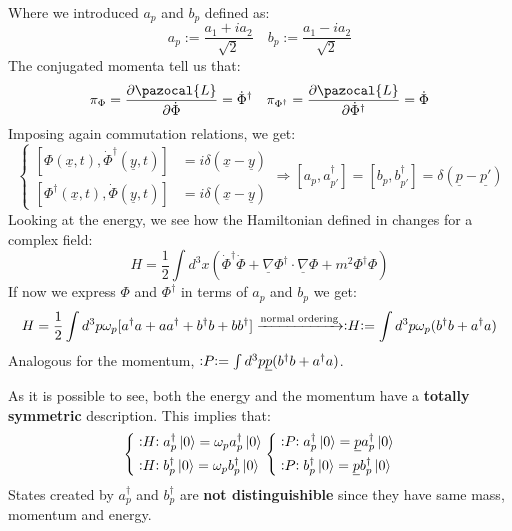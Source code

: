\documentclass[../main.tex]{subfiles}
\begin{document}
Where we introduced $a_p$ and $b_p$ defined as:
\[
a_p:=\frac{a_1+ia_2}{\sqrt{2}} \quad
b_p:=\frac{a_1-ia_2}{\sqrt{2}}
\]
The conjugated momenta tell us that:
\[
\pi_\Phi=\frac{\partial\pazocal{L}}{\partial\Dot{\Phi}}=\Dot{\Phi}^\dagger \quad 
\pi_{\Phi^\dagger}=\frac{\partial\pazocal{L}}{\partial\Dot{\Phi}^\dagger}=\Dot{\Phi}
\]
Imposing again commutation relations, we get:
\[
\left\{
\begin{aligned}
[\Phi(\underline{x},t),\Dot{\Phi}^\dagger(\underline{y},t)]&=i\delta(\underline{x}-\underline{y})\\
[\Phi^\dagger(\underline{x},t),\Dot{\Phi}(\underline{y},t)]&=i\delta(\underline{x}-\underline{y})
\end{aligned}
\right.
\Rightarrow
[a_p,a^\dagger_{p'}]=[b_p,b^\dagger_{p'}]=\delta(\underline{p}-\underline{p'})
\]
Looking at the energy, we see how the Hamiltonian defined in  changes for a complex field:
\[
H=\frac{1}{2}\int d^3x\left(\Dot{\Phi}^\dagger\Dot{\Phi}+\underline{\nabla}\Phi^\dagger\cdot\underline{\nabla}\Phi+m^2\Phi^\dagger\Phi\right)
\]
If now we express $\Phi$ and $\Phi^\dagger$ in terms of $a_p$ and $b_p$ we get:
\[
H=\frac{1}{2}\int d^3p\omega_p[a^\dagger a+aa^\dagger+b^\dagger b+bb^\dagger]\xrightarrow[]{\text{normal ordering}}\vcentcolon\mathrel{H}\vcentcolon=\int d^3p\omega_p(b^\dagger b+a^\dagger a)
\]
Analogous for the momentum, $\vcentcolon\mathrel{P}\vcentcolon=\int d^3p\underline{p}(b^\dagger b+a^\dagger a)$. 

As it is possible to see, both the energy and the momentum have a \textbf{totally symmetric} description. This implies that:
\[
\left\{
\begin{aligned}
&\vcentcolon\mathrel{H}\vcentcolon a^\dagger_p\ket{0}=\omega_pa^\dagger_p\ket{0}\\ &\vcentcolon\mathrel{H}\vcentcolon b^\dagger_p\ket{0}=\omega_pb^\dagger_p\ket{0}\end{aligned}
\right.
\left\{
\begin{aligned}
&\vcentcolon\mathrel{P}\vcentcolon a^\dagger_p\ket{0}=\underline{p}a^\dagger_p\ket{0}\\
&\vcentcolon\mathrel{P}\vcentcolon b^\dagger_p\ket{0}=\underline{p}b^\dagger_p\ket{0}
\end{aligned}
\right.
\]
States created by $a^\dagger_p$ and $b^\dagger_p$ are \textbf{not distinguishible} since they have same mass, momentum and energy. 
\end{document}
